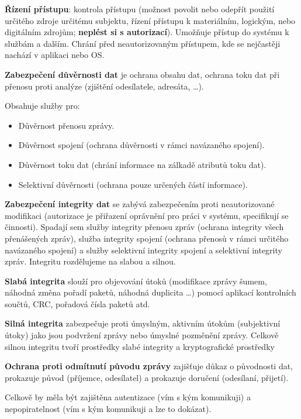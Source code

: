 \textbf{Řízení přístupu}: kontrola přístupu (možnost povolit nebo odepřít použití určitého zdroje určitému subjektu, řízení přístupu k materiálním, logickým, nebo digitálním zdrojům; \textbf{neplést si s autorizací}). Umožňuje přístup  do systému k službám a dalším. Chrání před neautorizovaným přístupem, kde se nejčastěji nachází v aplikaci nebo OS.

\textbf{Zabezpečení důvěrnosti dat} je ochrana obsahu dat, ochrana toku dat při přenosu proti analýze (zjištění odesílatele, adresáta, \dots). 

\noindent Obsahuje služby pro:
\begin{itemize}[noitemsep]
    \item Důvěrnost přenosu zprávy.
    \item Důvěrnost spojení (ochrana důvěrnosti v rámci navázaného spojení).
    \item Důvěrnost toku dat (chrání informace na zálkadě atributů toku dat).
    \item Selektivní důvěrnosti (ochrana pouze určených částí informace).
\end{itemize}

\textbf{Zabezpečení integrity dat} se zabývá zabezpečením proti neautorizované modifikaci (autorizace je přiřazení oprávnění pro práci v systému, specifikují se činnosti). Spadají sem služby integrity přenosu zpráv (ochrana integrity všech přenášených zpráv), služba integrity spojení (ochrana přenosů v rámci určitého navázaného spojení) a služby selektivní integrity spojení a selektivní integrity zpráv.
Integritu rozdělujeme na slabou a silnou.

\noindent \textbf{Slabá integrita} slouží pro objevování útoků (modifikace zprávy šumem, náhodná změna pořadí paketů, náhodná duplicita \dots) pomocí aplikací kontrolních součtů, CRC, pořadová čísla paketů atd.

\noindent \textbf{Silná integrita} zabezpečuje proti úmyslným, aktivním útokům (subjektivní útoky) jako jsou podvržení zprávy nebo úmyslné pozměnění zprávy. Celkově silnou integritu tvoří prostředky slabé integrity a kryptografické prostředky


\textbf{Ochrana proti odmítnutí původu zprávy} zajišťuje důkaz o původnosti dat, prokazuje původ (příjemce, odesílatel) a prokazuje doručení (odesílaní, přijetí).

\vspace{0,5cm}
Celkově by měla být zajištěna autentizace (vím s kým komunikuji) a nepopiratelnost (vím s kým komunikuji a lze to dokázat).

